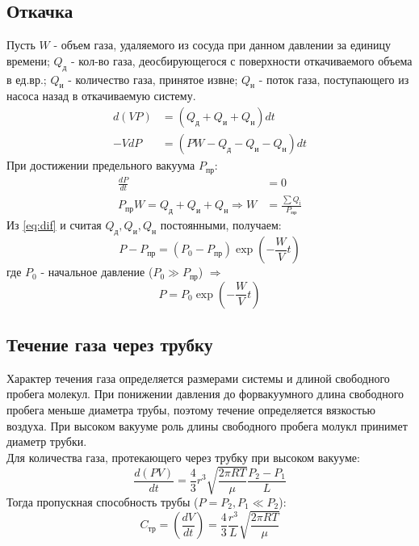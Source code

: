\subsection*{Откачка}
Пусть $W$ - объем газа, удаляемого из сосуда при данном давлении за 
единицу времени; $Q_{\text{д}}$ - кол-во газа, деосбирующегося с поверхности 
откачиваемого объема в ед.вр.; $Q_{\text{и}}$ - количество газа, принятое
извне; $Q_{\text{н}}$ - поток газа, поступающего из насоса назад в
откачиваемую систему. 
\begin{align}
    d(VP) &= (Q_{\text{д}} + Q_{\text{и}} + Q_{\text{н}}) dt \label{eq:dif}\\
    -VdP &= (PW - Q_{\text{д}} - Q_{\text{и}} - Q_{\text{н}}) dt
\end{align}
При достижении предельного вакуума $P_{\text{пр}}$:
\begin{align}
    \frac{dP}{dt} &= 0\\ 
    P_{\text{пр}}W = Q_{\text{д}} + Q_{\text{и}} + Q_{\text{н}} \Rightarrow W &= \frac{\sum Q_{\text{i}}}{P_{\text{пр}}}
\end{align}
Из \ref{eq:dif} и считая $Q_{\text{д}}, Q_{\text{и}}, Q_{\text{н}}$
постоянными, получаем:
\begin{equation}
P - P_{\text{пр}} = (P_0 - P_{\text{пр}})\exp{\left (-\frac{W}{V}t\right )}
\end{equation}
где $P_0$ - начальное давление ($P_0 \gg P_{\text{пр}}$) $\Rightarrow$
\begin{equation}
    P = P_0\exp(-\frac{W}{V}t)
\end{equation}

\subsection*{Течение газа через трубку}
Характер течения газа определяется размерами системы и длиной свободного 
пробега молекул. При понижении давления до форвакуумного длина свободного 
пробега меньше диаметра трубы, поэтому течение определяется вязкостью воздуха. 
При высоком вакууме роль длины свободного пробега молукл принимет диаметр
трубки. \\\indent 
Для количества газа, протекающего через трубку при высоком вакууме:
\begin{equation}
    \frac{d(PV)}{dt} = \frac{4}{3}r^3 \sqrt{\frac{2\pi RT}{\mu}} \frac{P_2 - P_1}{L}
\end{equation}
Тогда пропускная способность трубы ($P = P_2, P_1 \ll P_2$):
\begin{equation}
    C_{\text{тр}} = \left (\frac{dV}{dt} \right ) = \frac{4}{3}\frac{r^3}{L} \sqrt{\frac{2\pi RT}{\mu}}  
\end{equation}

